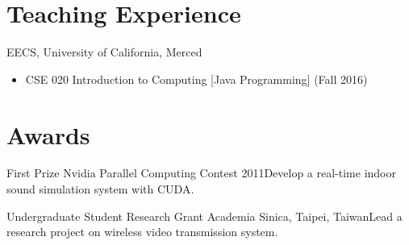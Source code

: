 \documentclass[11pt,letterpaper,sans]{moderncv} %
\begin{document}

\section{Teaching Experience}

%
{EECS, University of California, Merced}
{}{}{}
{
\begin{itemize}
	\item CSE 020 Introduction to Computing [Java Programming] (Fall 2016)
\end{itemize}
}


\section{Awards}

{First Prize}{}
{Nvidia Parallel Computing Contest 2011}{}{Develop a real-time indoor sound simulation system with CUDA.}

{Undergraduate Student Research Grant}{}
{Academia Sinica, Taipei, Taiwan}{}{Lead a research project on wireless video transmission system.}


%
%
\end{document}
